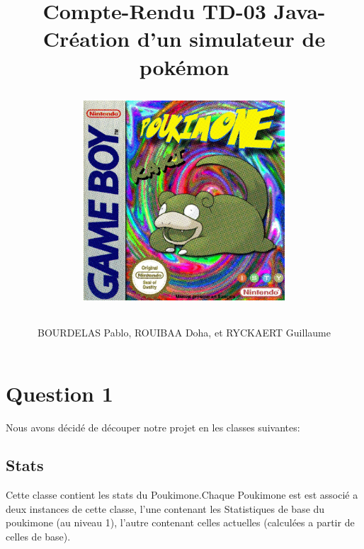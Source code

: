 \documentclass{report}
\begin{document}
\title{%
    \begin{minipage}\linewidth
        \centering
        Compte-Rendu TD-03 
        \vskip 3pt
        \large Java-Création d'un simulateur de pokémon
        \author{BOURDELAS Pablo, ROUIBAA Doha, et RYCKAERT Guillaume}
    \end{minipage}
\begin{figure}[ht!]
    \centering
    \includegraphics[width=75mm]{cover.jpg}
\end{figure}
    }   

\maketitle

\section*{Question 1}

Nous avons décidé de découper notre projet en les classes suivantes:
\subsection*{Stats}
Cette classe contient les stats du Poukimone.Chaque Poukimone est est associé a deux instances de cette classe, l'une contenant les Statistiques de base du poukimone (au niveau 1), l'autre contenant celles actuelles (calculées a partir de celles de base).
\end{document}
